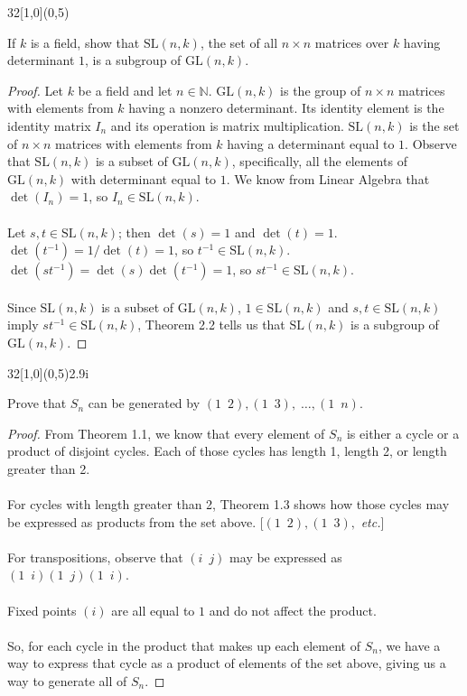 \documentclass[12pt]{article}
\newenvironment{exercise}[2]{\begin{textblock}{32}[1,0](0,#2)\noindent#1\end{textblock}}{\vspace{1in}}
\begin{document}
\newpage

\begin{exercise}{2.2}{5}
	{\noindent}If $k$ is a field, show that $\text{SL}(n,k)$, the set of all $n\times n$ matrices over $k$ having determinant $1$, is a subgroup of $\text{GL}(n,k)$.
	\bigskip
	\begin{proof}
		Let $k$ be a field and let $n\in\mathbb{N}$. $\text{GL}(n,k)$ is the group of $n\times n$ matrices with elements from $k$ having a nonzero determinant. Its identity element is the identity matrix $I_n$ and its operation is matrix multiplication.
		$\text{SL}(n,k)$ is the set of $n\times n$ matrices with elements from $k$ having a determinant equal to $1$. Observe that $\text{SL}(n,k)$ is a subset of $\text{GL}(n,k)$, specifically, all the elements of $\text{GL}(n,k)$ with determinant equal to $1$.
		We know from Linear Algebra that $\det(I_n)=1$, so $I_n\in \text{SL}(n,k)$.\\
		\\
		Let $s,t\in\text{SL}(n,k)$; then $\det(s)=1$ and $\det(t)=1$. $\det(t^{-1})=1/\det(t)=1$, so $t^{-1}\in\text{SL}(n,k)$.
		$\det(st^{-1})=\det(s)\det(t^{-1})=1$, so $st^{-1}\in\text{SL}(n,k)$.\\
		\\
		Since $\text{SL}(n,k)$ is a subset of $\text{GL}(n,k)$, $1\in \text{SL}(n,k)$ and $s, t\in \text{SL}(n,k)$ imply $st^{-1}\in\text{SL}(n,k)$, Theorem 2.2 tells us that $\text{SL}(n,k)$ is a subgroup of $\text{GL}(n,k)$.
	\end{proof}
\end{exercise}

\begin{exercise}{2.9i}{5}
	{\noindent}Prove that $S_n$ can be generated by $(1\enspace 2), (1\enspace 3),\;\dotsc, (1\enspace n)$.
	\bigskip
	\begin{proof}
		From Theorem 1.1, we know that every element of $S_n$ is either a cycle or a product of disjoint cycles.
		Each of those cycles has length 1, length 2, or length greater than 2.\\
		\\
		For cycles with length greater than 2, Theorem 1.3 shows how those cycles may be expressed as products from the set above. [$(1\enspace 2), (1\enspace 3), $ \textit{etc.}]\\
		\\
		For transpositions, observe that $(i\enspace j)$ may be expressed as $(1\enspace i)(1\enspace j)(1\enspace i)$.\\
		\\
		Fixed points $(i)$ are all equal to $1$ and do not affect the product.\\
		\\
		So, for each cycle in the product that makes up each element of $S_n$, we have a way to express that cycle as a product of elements of the set above, giving us a way to generate all of $S_n$.
	\end{proof}
\end{exercise}
\end{document}
